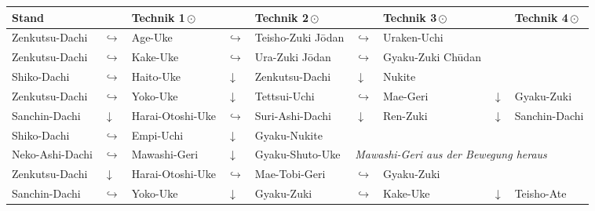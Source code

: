 	\setlength{\tabcolsep}{3pt}
	\null\vfill\null
	\begin{tabularx}{\textwidth}{lllllllll}
		\textbf{Stand} 		& & \textbf{Technik 1\,\(\odot\)} 	&& \textbf{Technik 2\,\(\odot\)} 	&& \textbf{Technik 3\,\(\odot\)}&& \textbf{Technik 4\,\(\odot\)}\\
		\midrule
		Zenkutsu-Dachi 		& \(\hookrightarrow\)	& Age-Uke					& \(\hookrightarrow\)	& Teisho-Zuki J\={o}dan	& \(\hookrightarrow\)	& Uraken-Uchi&&	\\
		\midrule
		Zenkutsu-Dachi 		& \(\hookrightarrow\)	& Kake-Uke					& \(\hookrightarrow\)	& Ura-Zuki J\={o}dan	& \(\hookrightarrow\)	& Gyaku-Zuki Ch\={u}dan&&	\\
		\midrule
		Shiko-Dachi			& \(\hookrightarrow\)	& Haito-Uke					& \(\downarrow\)		& Zenkutsu-Dachi 		& \(\downarrow\)		& Nukite&&\\
		\midrule
		Zenkutsu-Dachi		& \(\hookrightarrow\)	& Yoko-Uke					& \(\downarrow\)		& Tettsui-Uchi			& \(\hookrightarrow\)	& Mae-Geri &\(\downarrow\) & Gyaku-Zuki\\
		\midrule
		Sanchin-Dachi		& \(\downarrow\)		& Harai-Otoshi-Uke			& \(\hookrightarrow\)	& Suri-Ashi-Dachi		& \(\downarrow\)		& Ren-Zuki &\(\downarrow\) & Sanchin-Dachi\\
		\midrule
		Shiko-Dachi			& \(\hookrightarrow\)	& Empi-Uchi					& \(\downarrow\)		& Gyaku-Nukite			&&&&\\
		\midrule
		Neko-Ashi-Dachi		& \(\hookrightarrow\)	& Mawashi-Geri	& \(\downarrow\)		& Gyaku-Shuto-Uke		&\multicolumn{4}{l}{\textit{{\footnotesize Mawashi-Geri aus der Bewegung heraus}}}\\
		\midrule
		Zenkutsu-Dachi		& \(\downarrow\)		& Harai-Otoshi-Uke			& \(\hookrightarrow\)	& Mae-Tobi-Geri			& \(\hookrightarrow\)	& Gyaku-Zuki &&\\
		\midrule
		Sanchin-Dachi		& \(\hookrightarrow\)	& Yoko-Uke					& \(\downarrow\)		& Gyaku-Zuki			& \(\hookrightarrow\)	& Kake-Uke	& \(\downarrow\)& Teisho-Ate \\					
	\end{tabularx}\\\null\vfill\null
	\setlength{\tabcolsep}{6pt}